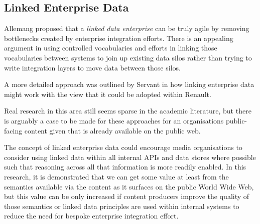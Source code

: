 \subsection{Linked Enterprise Data}

Allemang\cite{allemang2010semantic} proposed that a
\emph{linked data enterprise} can be truly agile by removing bottlenecks
created by enterprise integration efforts. There is an appealing
argument in using controlled vocabularies and efforts in linking
those vocabularies between systems to join up existing data silos
rather than trying to write integration layers to move data between
those silos.

A more detailed approach was outlined by Servant\cite{servant2008linking}
in how linking enterprise data might work with the view that it
could be adopted within Renault.

Real research in this area still seems sparse in the academic
literature, but there is arguably a case to be made for these
approaches for an organisations public-facing content given that is
already available on the public web.

The concept of linked enterprise data could encourage media
organisations to consider using linked data within all internal APIs
and data stores where possible such that reasoning across all that
information is more readily enabled. In this research, it is demonstrated
that we can get some value at least from the semantics available via
the content as it surfaces on the public World Wide Web, but this
value can be only increased if content producers improve the quality
of those semantics or linked data principles are used within internal
systems to reduce the need for bespoke enterprise integration effort.
